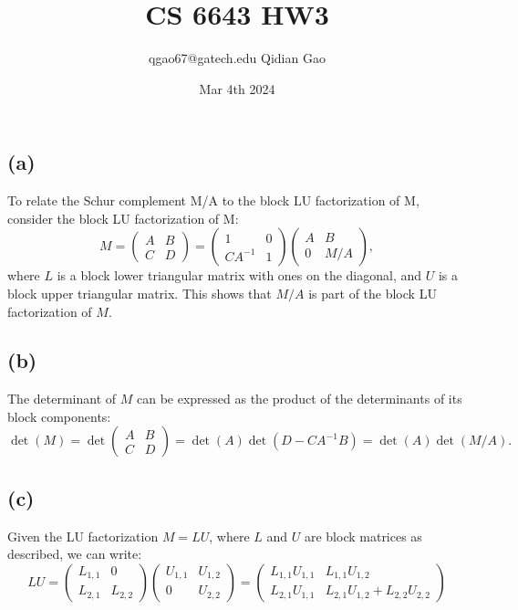 \documentclass{article}
\title{CS 6643 HW3}
\author{qgao67@gatech.edu Qidian Gao}
\date{Mar 4th 2024}
\begin{document}
\maketitle
\section{}
\subsection{(a)}
To relate the Schur complement M/A to the block LU factorization of M, consider the block LU factorization of M:
$$
M=\left(\begin{array}{ll}
A & B \\
C & D
\end{array}\right)=\left(\begin{array}{cc}
1 & 0 \\
C A^{-1} & 1
\end{array}\right)\left(\begin{array}{cc}
A & B \\
0 & M / A
\end{array}\right),
$$
where $L$ is a block lower triangular matrix with ones on the diagonal, and $U$ is a block upper triangular matrix. This shows that $M / A$ is part of the block LU factorization of $M$.
\subsection{(b)}
The determinant of $M$ can be expressed as the product of the determinants of its block components:
$$
\operatorname{det}(M)=\operatorname{det}\left(\begin{array}{ll}
A & B \\
C & D
\end{array}\right)=\operatorname{det}(A) \operatorname{det}\left(D-C A^{-1} B\right)=\operatorname{det}(A) \operatorname{det}(M / A) \text {. }
$$

\subsection{(c)} Given the LU factorization $M=L U$, where $L$ and $U$ are block matrices as described, we can write:
$$
L U=\left(\begin{array}{cc}
L_{1,1} & 0 \\
L_{2,1} & L_{2,2}
\end{array}\right)\left(\begin{array}{cc}
U_{1,1} & U_{1,2} \\
0 & U_{2,2}
\end{array}\right)=\left(\begin{array}{cc}
L_{1,1} U_{1,1} & L_{1,1} U_{1,2} \\
L_{2,1} U_{1,1} & L_{2,1} U_{1,2}+L_{2,2} U_{2,2}
\end{array}\right)
$$
\end{document}
